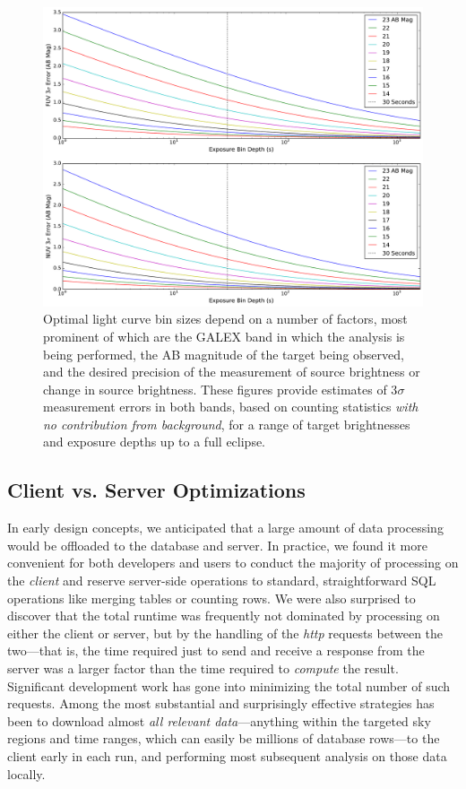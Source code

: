 \documentclass[iop]{emulateapj}
\begin{document}
\begin{figure}[h]
\includegraphics[scale=0.25]{Fig11.pdf}
\caption{Optimal light curve bin sizes depend on a number of factors, most prominent of which are the GALEX band in which the analysis is being performed, the AB magnitude of the target being observed, and the desired precision of the measurement of source brightness or change in source brightness. These figures provide estimates of 3$\sigma$ measurement errors in both bands, based on counting statistics \emph{with no contribution from background}, for a range of target brightnesses and exposure depths up to a full eclipse.
\label{sigmadetlim}}
\end{figure}

\subsection{Client vs. Server Optimizations}
\label{speedopt}
In early design concepts, we anticipated that a large amount of data processing would be offloaded to the database and server. In practice, we found it more convenient for both developers and users to conduct the majority of processing on the \emph{client} and reserve server-side operations to standard, straightforward SQL operations like merging tables or counting rows. We were also surprised to discover that the total runtime was frequently not dominated by processing on either the client or server, but by the handling of the \emph{http} requests between the two---that is, the time required just to send and receive a response from the server was a larger factor than the time required to \emph{compute} the result. Significant development work has gone into minimizing the total number of such requests. Among the most substantial and surprisingly effective strategies has been to download almost \emph{all relevant data}---anything within the targeted sky regions and time ranges, which can easily be millions of database rows---to the client early in each run, and performing most subsequent analysis on those data locally.
\end{document}
